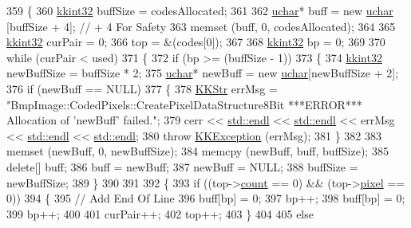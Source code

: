 \begin{DoxyCode}
359 \{
360   \hyperlink{namespace_k_k_b_a8fa4952cc84fda1de4bec1fbdd8d5b1b}{kkint32}  buffSize = codesAllocated;
361 
362   \hyperlink{namespace_k_k_b_ace9969169bf514f9ee6185186949cdf7}{uchar}* buff = \textcolor{keyword}{new} \hyperlink{namespace_k_k_b_ace9969169bf514f9ee6185186949cdf7}{uchar} [buffSize + 4];  \textcolor{comment}{// + 4 For Safety}
363   memset (buff, 0, codesAllocated);
364 
365   \hyperlink{namespace_k_k_b_a8fa4952cc84fda1de4bec1fbdd8d5b1b}{kkint32}  curPair = 0;
366   top = &(codes[0]);
367 
368   \hyperlink{namespace_k_k_b_a8fa4952cc84fda1de4bec1fbdd8d5b1b}{kkint32}  bp = 0;
369 
370   \textcolor{keywordflow}{while}  (curPair < used)
371   \{
372     \textcolor{keywordflow}{if}  (bp >= (buffSize - 1))
373     \{
374       \hyperlink{namespace_k_k_b_a8fa4952cc84fda1de4bec1fbdd8d5b1b}{kkint32}  newBuffSize = buffSize * 2;
375       \hyperlink{namespace_k_k_b_ace9969169bf514f9ee6185186949cdf7}{uchar}* newBuff = \textcolor{keyword}{new} \hyperlink{namespace_k_k_b_ace9969169bf514f9ee6185186949cdf7}{uchar}[newBuffSize + 2];
376       \textcolor{keywordflow}{if}  (newBuff == NULL)
377       \{
378         \hyperlink{class_k_k_b_1_1_k_k_str}{KKStr}  errMsg = \textcolor{stringliteral}{"BmpImage::CodedPixels::CreatePixelDataStructure8Bit    ***ERROR***    
       Allocation of 'newBuff'  failed."};
379         cerr << \hyperlink{namespace_k_k_b_ad1f50f65af6adc8fa9e6f62d007818a8}{std::endl} << \hyperlink{namespace_k_k_b_ad1f50f65af6adc8fa9e6f62d007818a8}{std::endl} << errMsg << \hyperlink{namespace_k_k_b_ad1f50f65af6adc8fa9e6f62d007818a8}{std::endl} << 
      \hyperlink{namespace_k_k_b_ad1f50f65af6adc8fa9e6f62d007818a8}{std::endl};
380         \textcolor{keywordflow}{throw}  \hyperlink{class_k_k_b_1_1_k_k_exception}{KKException} (errMsg);
381       \}
382 
383       memset (newBuff, 0, newBuffSize);
384       memcpy (newBuff, buff, buffSize);
385       \textcolor{keyword}{delete}[] buff;
386       buff = newBuff;
387       newBuff = NULL;
388       buffSize = newBuffSize;
389     \}
390 
391 
392     \{
393       \textcolor{keywordflow}{if}  ((top->\hyperlink{struct_bmp_image_1_1_code_pair_a1501fa5638588a3a7afdbbfb62327dae}{count} == 0)  &&  (top->\hyperlink{struct_bmp_image_1_1_code_pair_ac341a7d727f931dc9c446eb1d67fe022}{pixel} == 0))
394       \{
395         \textcolor{comment}{// Add End Of Line }
396         buff[bp] = 0;
397         bp++;
398         buff[bp] = 0;
399         bp++;
400 
401         curPair++;
402         top++;
403       \}
404 
405       \textcolor{keywordflow}{else}

\end{DoxyCode}
